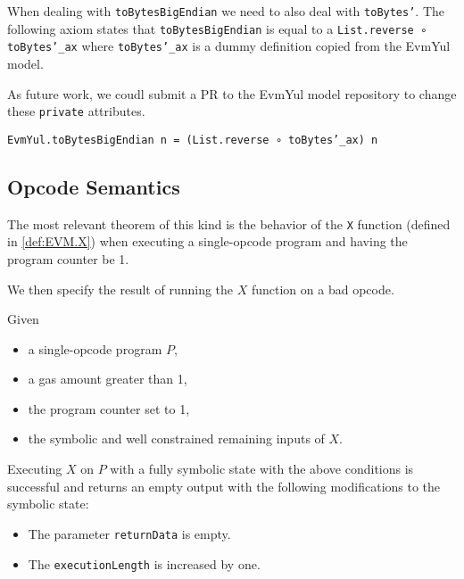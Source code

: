 When dealing with \texttt{toBytesBigEndian} we need to also deal with
\texttt{toBytes'}. The following axiom states that \texttt{toBytesBigEndian} is
equal to a \texttt{List.reverse ∘ toBytes'_ax} where \texttt{toBytes'_ax} is a
dummy definition copied from the EvmYul model.

As future work, we coudl submit a PR to the EvmYul model repository to change
these \texttt{private} attributes.

\begin{theorem}
\label{thm:toBytesBigEndian_rw}
\texttt{EvmYul.toBytesBigEndian n = (List.reverse ∘ toBytes'_ax) n}
\end{theorem}

\subsection{Opcode Semantics}

The most relevant theorem of this kind is the behavior of the \texttt{X}
function (defined in \ref{def:EVM.X}) when executing a single-opcode program and
having the program counter be 1.


We then specify the result of running the $X$ function on a bad opcode.

\begin{theorem}[X_bad_pc]\label{thm:X_bad_pc}\leanok
Given
\begin{itemize}
\item a single-opcode program $P$,
\item a gas amount greater than 1,
\item the program counter set to 1,
\item the symbolic and well constrained remaining inputs of $X$.
\end{itemize}
Executing $X$ on $P$ with a fully symbolic state with the above conditions
is successful and returns an empty output with the following modifications to
the symbolic state:
\begin{itemize}
\item The parameter \texttt{returnData} is empty.
\item The \texttt{executionLength} is increased by one.
\end{itemize}
\end{theorem}

